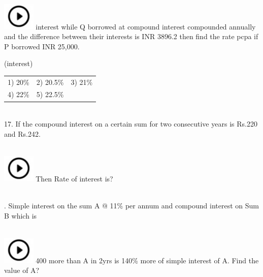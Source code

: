 \documentclass{article}
\begin{document}
	\noindent \\ \includegraphics*[width=0.60in, height=0.52in]{images/image1} interest while Q borrowed at compound interest compounded annually and the difference between  their interests is INR 3896.2 then find the rate pcpa if P borrowed INR 25,000.
	
	\noindent 
	
	\noindent (interest)
	
	\noindent 
	
	\noindent \begin{tabular}{p{1.7in} p{1.6in} p{1.6in}} \\ 
 1) 20\%                    & 2) 20.5\%           & 3) 21\%              \\
4) 22\%              & 5) 22.5\% \\
\end{tabular}
	
	\noindent 
	
	\noindent  \\ 
	
	17. If the compound interest on a certain sum for two consecutive years is Rs.220 and Rs.242.  
	 
	\noindent \\ \includegraphics*[width=0.60in, height=0.52in]{images/image1} Then Rate of interest is?
	
	\noindent  \\ 
	
	. Simple interest on the sum A @ 11\% per annum and compound interest on Sum B which is
	
	\noindent  
	 
	\noindent \\ \includegraphics*[width=0.60in, height=0.52in]{images/image1} 400 more than A in 2yrs is 140\% more of simple interest of A. Find the value of A?
	
	\noindent  \\ 
	
\end{document}
